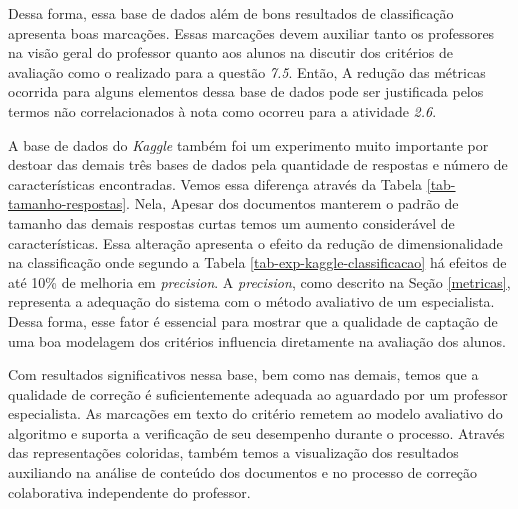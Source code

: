 Dessa forma, essa base de dados além de bons resultados de classificação apresenta boas marcações. Essas marcações devem auxiliar tanto os professores na visão geral do professor quanto aos alunos na discutir dos critérios de avaliação como o realizado para a questão \textit{7.5}. Então, A redução das métricas ocorrida para alguns elementos dessa base de dados pode ser justificada pelos termos não correlacionados à nota como ocorreu para a atividade \textit{2.6}.

A base de dados do \textit{Kaggle} também foi um experimento muito importante por destoar das demais três bases de dados pela quantidade de respostas e número de características encontradas. Vemos essa diferença através da Tabela \ref{tab-tamanho-respostas}. Nela, Apesar dos documentos manterem o padrão de tamanho das demais respostas curtas temos um aumento considerável de características. Essa alteração apresenta o efeito da redução de dimensionalidade na classificação onde segundo a Tabela \ref{tab-exp-kaggle-classificacao} há efeitos de até 10\% de melhoria em \textit{precision}. A \textit{precision}, como descrito na Seção \ref{metricas}, representa a adequação do sistema com o método avaliativo de um especialista. Dessa forma, esse fator é essencial para mostrar que a qualidade de captação de uma boa modelagem dos critérios influencia diretamente na avaliação dos alunos.

Com resultados significativos nessa base, bem como nas demais, temos que a qualidade de correção é suficientemente adequada ao aguardado por um professor especialista. As marcações em texto do critério remetem ao modelo avaliativo do algoritmo e suporta a verificação de seu desempenho durante o processo. Através das representações coloridas, também temos a visualização dos resultados auxiliando na análise de conteúdo dos documentos e no processo de correção colaborativa independente do professor.